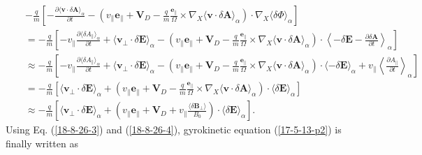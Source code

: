 \documentclass{article}
\begin{document}
\begin{eqnarray}
  &  & - \frac{q}{m} \left[ - \frac{\partial \langle \mathbf{v} \cdot \delta
  \mathbf{A} \rangle_{\alpha}}{\partial t} - \left( v_{\parallel}
  \mathbf{e}_{\parallel} +\mathbf{V}_D - \frac{q}{m} 
  \frac{\mathbf{e}_{\parallel}}{\Omega} \times \nabla_X \langle \mathbf{v}
  \cdot \delta \mathbf{A} \rangle_{\alpha} \right) \cdot \nabla_X \langle
  \delta \Phi \rangle_{\alpha} \right] \nonumber\\
  &  & = - \frac{q}{m} \left[ - v_{\parallel} \frac{\partial \langle \delta
  A_{\parallel} \rangle_{\alpha}}{\partial t} + \langle \mathbf{v}_{\perp}
  \cdot \delta \mathbf{E} \rangle_{\alpha} - \left( v_{\parallel}
  \mathbf{e}_{\parallel} +\mathbf{V}_D - \frac{q}{m} 
  \frac{\mathbf{e}_{\parallel}}{\Omega} \times \nabla_X \langle \mathbf{v}
  \cdot \delta \mathbf{A} \rangle_{\alpha} \right) \cdot \left\langle - \delta
  \mathbf{E}- \frac{\partial \delta \mathbf{A}}{\partial t}
  \right\rangle_{\alpha} \right] \nonumber\\
  &  & \approx - \frac{q}{m} \left[ - v_{\parallel} \frac{\partial \langle
  \delta A_{\parallel} \rangle_{\alpha}}{\partial t} + \langle
  \mathbf{v}_{\perp} \cdot \delta \mathbf{E} \rangle_{\alpha} - \left(
  v_{\parallel} \mathbf{e}_{\parallel} +\mathbf{V}_D - \frac{q}{m} 
  \frac{\mathbf{e}_{\parallel}}{\Omega} \times \nabla_X \langle \mathbf{v}
  \cdot \delta \mathbf{A} \rangle_{\alpha} \right) \cdot \langle - \delta
  \mathbf{E} \rangle_{\alpha} + v_{\parallel} \left\langle \frac{\partial
  A_{\parallel}}{\partial t} \right\rangle_{\alpha} \right] \nonumber\\
  &  & = - \frac{q}{m} \left[ \langle \mathbf{v}_{\perp} \cdot \delta
  \mathbf{E} \rangle_{\alpha} + \left( v_{\parallel} \mathbf{e}_{\parallel}
  +\mathbf{V}_D - \frac{q}{m}  \frac{\mathbf{e}_{\parallel}}{\Omega} \times
  \nabla_X \langle \mathbf{v} \cdot \delta \mathbf{A} \rangle_{\alpha} \right)
  \cdot \langle \delta \mathbf{E} \rangle_{\alpha} \right] \nonumber\\
  &  & \approx - \frac{q}{m} \left[ \langle \mathbf{v}_{\perp} \cdot \delta
  \mathbf{E} \rangle_{\alpha} + \left( v_{\parallel} \mathbf{e}_{\parallel}
  +\mathbf{V}_D + v_{\parallel} \frac{\langle \delta \mathbf{B}_{\perp}
  \rangle}{B_0} \right) \cdot \langle \delta \mathbf{E} \rangle_{\alpha}
  \right] .  \label{18-8-26-3}
\end{eqnarray}
Using Eq. (\ref{18-8-26-3}) and (\ref{18-8-26-4}), gyrokinetic equation
(\ref{17-5-13-p2}) is finally written as
\end{document}
